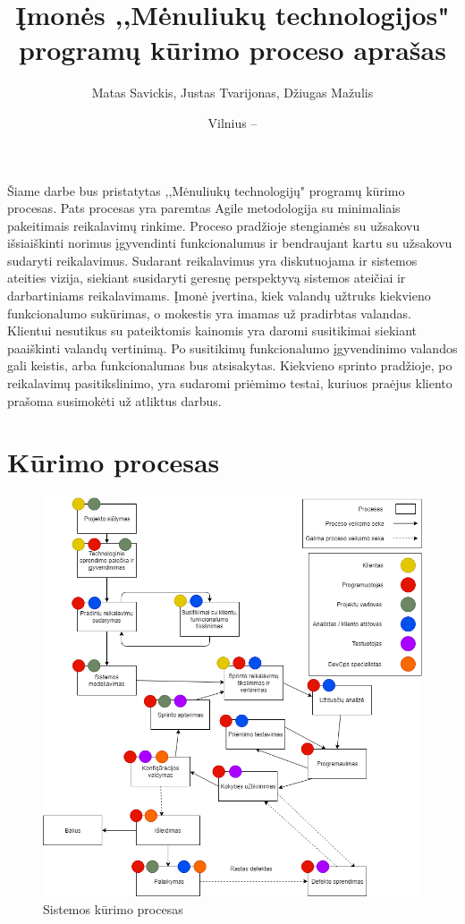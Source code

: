 \documentclass{VUMIFPSkursinis}
\title{Įmonės ,,Mėnuliukų technologijos" programų kūrimo proceso aprašas}
\author{Matas Savickis, Justas Tvarijonas, Džiugas Mažulis}
\date{Vilnius – \the\year}
\begin{document}
\maketitle

\tableofcontents

	Šiame darbe bus pristatytas ,,Mėnuliukų technologijų" programų kūrimo procesas.
	Pats procesas yra paremtas Agile metodologija su minimaliais pakeitimais reikalavimų rinkime.
	Proceso pradžioje stengiamės su užsakovu išsiaiškinti norimus įgyvendinti funkcionalumus ir bendraujant kartu su užsakovu sudaryti reikalavimus. 
	Sudarant reikalavimus yra diskutuojama ir sistemos ateities vizija, siekiant susidaryti geresnę perspektyvą sistemos ateičiai ir darbartiniams reikalavimams.
	Įmonė įvertina, kiek valandų užtruks kiekvieno funkcionalumo sukūrimas, o mokestis yra imamas už pradirbtas valandas.
	Klientui nesutikus su pateiktomis kainomis yra daromi susitikimai siekiant paaiškinti valandų vertinimą. Po susitikimų funkcionalumo įgyvendinimo valandos gali keistis, arba funkcionalumas bus atsisakytas. 
	Kiekvieno sprinto pradžioje, po reikalavimų pasitikslinimo, yra sudaromi priėmimo testai, kuriuos praėjus kliento prašoma susimokėti už atliktus darbus.

\section{Kūrimo procesas}
	\begin{figure}[htbp]
	\includegraphics[scale=0.6]{img/SoftwareProcessMoonTechnologies}
	\caption{Sistemos kūrimo procesas} %
	\label{img:kurimoProcesas}
	\end{figure}
	\newpage
\end{document}
